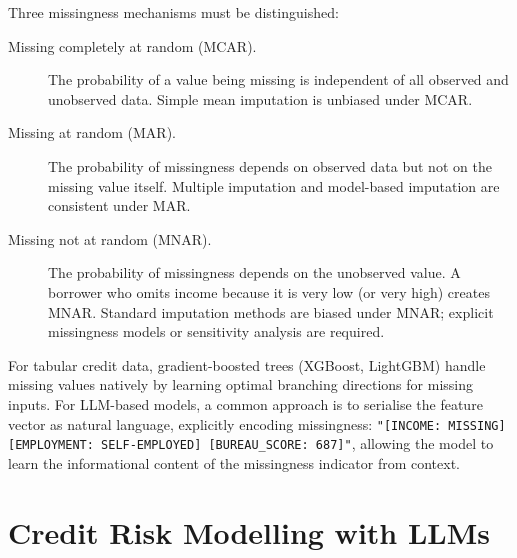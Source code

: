 \begin{context}
Three missingness mechanisms must be distinguished:
\begin{description}
  \item[Missing completely at random (MCAR).] The probability of a value being missing is independent of all observed and unobserved data. Simple mean imputation is unbiased under MCAR.
  \item[Missing at random (MAR).] The probability of missingness depends on observed data but not on the missing value itself. Multiple imputation and model-based imputation are consistent under MAR.
  \item[Missing not at random (MNAR).] The probability of missingness depends on the unobserved value. A borrower who omits income because it is very low (or very high) creates MNAR. Standard imputation methods are biased under MNAR; explicit missingness models or sensitivity analysis are required.
\end{description}

For tabular credit data, gradient-boosted trees (XGBoost, LightGBM) handle missing values natively by learning optimal branching directions for missing inputs. For LLM-based models, a common approach is to serialise the feature vector as natural language, explicitly encoding missingness: \texttt{"[INCOME: MISSING] [EMPLOYMENT: SELF-EMPLOYED] [BUREAU\_SCORE: 687]"}, allowing the model to learn the informational content of the missingness indicator from context.

\end{context}

\section{Credit Risk Modelling with LLMs}
\label{sec:credit-modelling}


